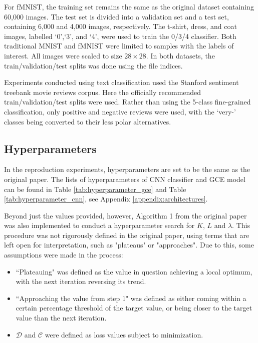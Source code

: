 For fMNIST, the training set remains the same as the original dataset containing 60,000 images. The test set is divided into a validation set and a test set, containing 6,000 and 4,000 images, respectively. The t-shirt, dress, and coat images, labelled `0',`3', and `4', were used to train the 0/3/4 classifier. Both traditional  MNIST and fMNIST were limited to samples with the labels of interest. All images were scaled to size $28 \times 28$. In both datasets, the train/validation/test splits was done using the file indices.

Experiments conducted using text classification used the Stanford sentiment treebank \cite{socher2013recursive} movie reviews corpus. Here the officially recommended train/validation/test splits were used. Rather than using the 5-class fine-grained classification, only positive and negative reviews were used, with the `very-' classes being converted to their less polar alternatives. 

\subsection{Hyperparameters}
In the reproduction experiments,  hyperparameters are set to be the same as the original paper.  The lists of hyperparameters of CNN classifier and GCE model can be found in Table \ref{tab:hyperparameter_gce} and Table \ref{tab:hyperparameter_cnn}, see Appendix \ref{appendix:architectures}. 

Beyond just the values provided, however, Algorithm 1 from the original paper was also implemented to conduct a hyperparameter search for $K$, $L$ and $\lambda$. This procedure was not rigorously defined in the original paper, using terms that are left open for interpretation, such as "plateaus" or "approaches". Due to this, some assumptions were made in the process:
\begin{itemize}
	\item ``Plateauing" was defined as the value in question achieving a local optimum, with the next iteration reversing its trend.
	\item ``Approaching the value from step 1" was defined as either coming within a certain percentage threshold of the target value, or being closer to the target value than the next iteration.
	\item $\mathcal{D}$ and $\mathcal{C}$ were defined as loss values subject to minimization.
\end{itemize}

